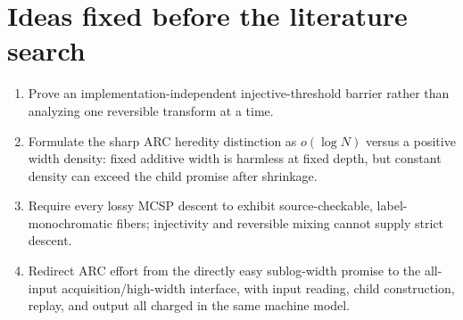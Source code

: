 \documentclass[11pt]{article}
\begin{document}
\section*{Ideas fixed before the literature search}
\begin{enumerate}
\item Prove an implementation-independent injective-threshold barrier rather
than analyzing one reversible transform at a time.
\item Formulate the sharp ARC heredity distinction as $o(\log N)$ versus a
positive width density: fixed additive width is harmless at fixed depth, but
constant density can exceed the child promise after shrinkage.
\item Require every lossy MCSP descent to exhibit source-checkable,
label-monochromatic fibers; injectivity and reversible mixing cannot supply
strict descent.
\item Redirect ARC effort from the directly easy sublog-width promise to the
all-input acquisition/high-width interface, with input reading, child
construction, replay, and output all charged in the same machine model.
\end{enumerate}
\end{document}
